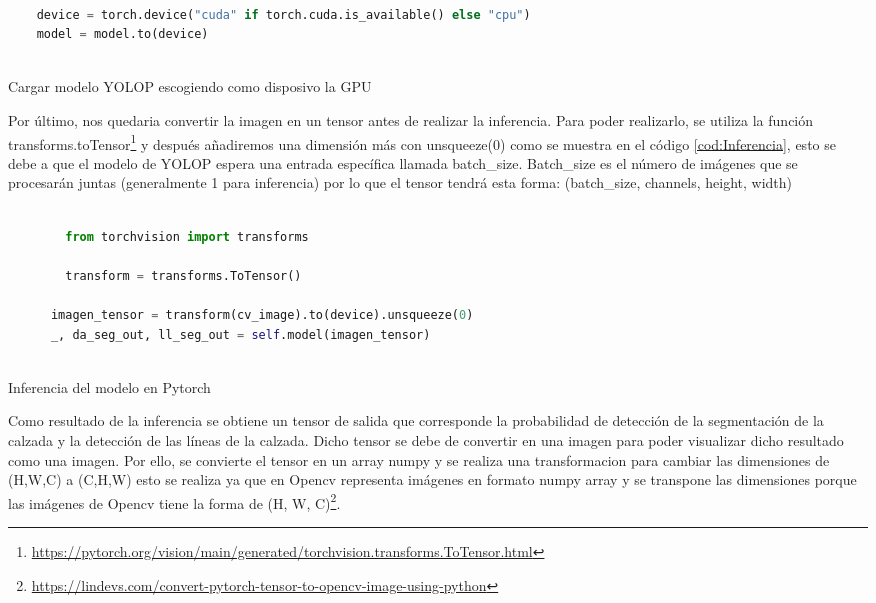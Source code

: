   
  \begin{code}[h]
    \begin{lstlisting}[language=Python]
   
    device = torch.device("cuda" if torch.cuda.is_available() else "cpu")
    model = model.to(device)
  
    \end{lstlisting}
    \caption[Cargar modelo YOLOP escogiendo como disposivo la GPU]{Cargar modelo YOLOP escogiendo como disposivo la GPU}
    \label{cod:codeloadYOLOP}
    \end{code}  

    Por último, nos quedaria convertir la imagen en un tensor antes de realizar la inferencia. Para poder realizarlo, se utiliza la función transforms.toTensor\footnote{\url{https://pytorch.org/vision/main/generated/torchvision.transforms.ToTensor.html}} 
    y después añadiremos una dimensión más con unsqueeze(0) como se muestra en el código \ref{cod:Inferencia}, esto se debe 
    a que el modelo de YOLOP espera una entrada específica llamada batch\_size. Batch\_size es el número de imágenes que se procesarán juntas
    (generalmente 1 para inferencia) por lo que el tensor tendrá esta forma: (batch\_size, channels, height, width)\newline

    \begin{code}[h]
      \begin{lstlisting}[language=Python]
     
        from torchvision import transforms

        transform = transforms.ToTensor() 
                    
      imagen_tensor = transform(cv_image).to(device).unsqueeze(0)
      _, da_seg_out, ll_seg_out = self.model(imagen_tensor)
    
      \end{lstlisting}
      \caption[Inferencia del modelo]{Inferencia del modelo en Pytorch}
      \label{cod:Inferencia}
      \end{code}  

    Como resultado de la inferencia se obtiene un tensor de salida que corresponde la probabilidad de detección de la segmentación
    de la calzada y la detección de las líneas de la calzada. Dicho tensor se debe de convertir en una imagen para poder visualizar
    dicho resultado como una imagen. 
    Por ello, se convierte el tensor en un array numpy y se realiza una transformacion para cambiar las dimensiones de (H,W,C) 
    a (C,H,W) esto se realiza ya que en Opencv representa imágenes en formato numpy array y se transpone las dimensiones porque las
    imágenes de Opencv tiene la forma de (H, W, C)\footnote{\url{https://lindevs.com/convert-pytorch-tensor-to-opencv-image-using-python}}. 

